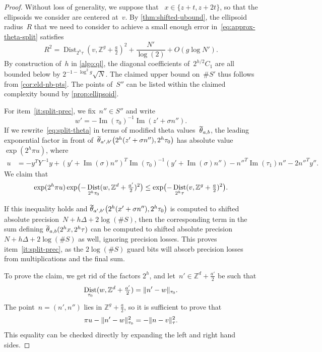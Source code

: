 \documentclass[12pt,oneside]{amsart}
\numberwithin{equation}{section}
\theoremstyle{definition}
\newcommand{\Z}{\mathbb{Z}}
\DeclareMathOperator{\im}{Im}
\DeclareMathOperator{\Dist}{Dist}
\DeclareMathOperator{\thetatilde}{\rlap{\raisebox{-0.1ex}{$\widetilde{\phantom{\,t}}$}}\theta}
\DeclarePairedDelimiter{\paren}{(}{)}
\DeclarePairedDelimiter{\norm}{\|}{\|}
\begin{document}
\begin{proof}
  Without loss of generality, we suppose that ~$x\in\{z+t,z+2t\}$, so that the
  ellipsoids we consider are centered at~$v$. By \cref{thm:shifted-ubound},
  the ellipsoid radius~$R$ that we need to consider to achieve a small enough
  error in~\eqref{eq:approx-theta-split} satisfies
  \begin{displaymath}
    R^2 = \Dist_{2^h\tau}(v, \Z^g + \tfrac a2)^2 + \frac{N'}{\log(2)} + O(g\log N').
  \end{displaymath}
  By construction of~$h$ in \cref{algo:ql}, the diagonal coefficients
  of~$2^{h/2}C_1$ are all bounded below by $2^{-1-\log^2 g}\sqrt{N}$. The
  claimed upper bound on~$\#S'$ thus follows from \cref{cor:eld-nb-pts}. The
  points of~$S''$ can be listed within the claimed complexity bound by
  \cref{prop:ellipsoid}.

  For item~\eqref{it:split-prec}, we fix~$n'' \in S''$ and write
  \begin{displaymath}
    w' = -\im(\tau_0)^{-1} \im(z' + \sigma n'').
  \end{displaymath}
  If we rewrite~\eqref{eq:split-theta} in terms of modified theta
  values~$\thetatilde_{a,b}$, the leading exponential factor in front
  of~$\thetatilde_{a',b'}\paren[\big]{2^h(z'+\sigma n''),2^h\tau_0}$ has absolute value
  $\exp(2^h \pi u)$, where
  \begin{align*}
    u &= - y^T Y^{-1} y + (y' + \im(\sigma)n'')^T \im(\tau_0)^{-1} (y' + \im(\sigma) n'')- n''^T \im(\tau_1) n'' - 2 n''^T y''.
  \end{align*}
  We claim that
  \begin{displaymath}
    \exp(2^h \pi u) \exp \paren[\big]{-\Dist_{2^h\tau_0}(w, \Z^{d} + \tfrac{a'}{2})^2}
    \leq \exp\paren[\big]{-\Dist_{2^h\tau}(v,\Z^g + \tfrac a2)^2}.
  \end{displaymath}

  If this inequality holds and
  $\thetatilde_{a',b'}\paren[\big]{2^h(x'+\sigma n''), 2^h\tau_0}$ is computed
  to shifted absolute precision~$N + h\Delta + 2\log(\#S)$, then the
  corresponding term in the sum defining $\thetatilde_{a,b}(2^hx,2^h\tau)$ can
  be computed to shifted absolute precision $N + h\Delta + 2\log(\#S)$ as well,
  ignoring precision losses. This proves item~\eqref{it:split-prec}, as the
  $2\log(\#S)$ guard bits will absorb precision losses from
  multiplications and the final sum.

  To prove the claim, we get rid of the factors $2^h$, and
  let~$n' \in \Z^{d} + \tfrac{a'}{2}$ be such that
  \begin{displaymath}
    \Dist_{\tau_0}(w, \Z^d + \tfrac {a'}{2}) = \norm{n'-w}_{\tau_0}.
  \end{displaymath}
  The point~$n = (n', n'')$ lies in $\Z^g + \tfrac a2$, so it is sufficient to
  prove that
  \begin{displaymath}
    \pi u -\norm{n'-w}_{\tau_0}^2 = -\norm{n - v}_\tau^2.
  \end{displaymath}
  This equality can be checked directly by expanding the left and right hand sides.


\end{proof}
\end{document}
